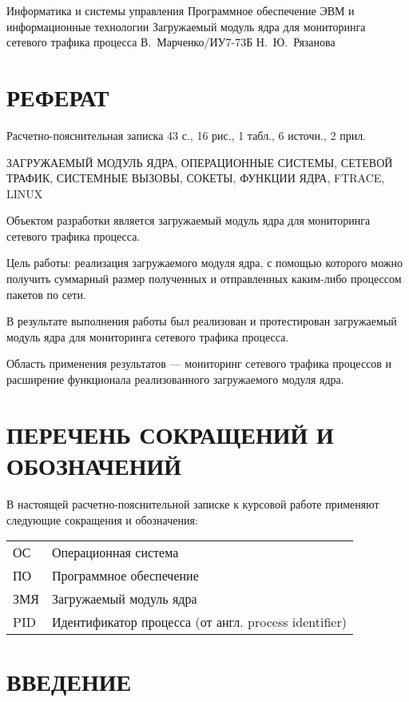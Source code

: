 \documentclass{bmstu}
\begin{document}
\makecourseworktitle
    {Информатика и системы управления}
    {Программное обеспечение ЭВМ и информационные технологии}
    {Загружаемый модуль ядра для мониторинга сетевого трафика процесса}
    {В.~Марченко/ИУ7-73Б}
    {Н.~Ю.~Рязанова}
    {}

\setcounter{page}{3}

{\centering \chapter*{РЕФЕРАТ}}

Расчетно-пояснительная записка 43 с., 16 рис., 1 табл., 6 источн., 2 прил.

\noindent ЗАГРУЖАЕМЫЙ МОДУЛЬ ЯДРА, ОПЕРАЦИОННЫЕ СИСТЕМЫ, СЕТЕВОЙ ТРАФИК, СИСТЕМНЫЕ ВЫЗОВЫ, СОКЕТЫ, ФУНКЦИИ ЯДРА, FTRACE, LINUX

Объектом разработки является загружаемый модуль ядра для мониторинга сетевого трафика процесса.

Цель работы: реализация загружаемого модуля ядра, с помощью которого можно получить суммарный размер полученных и отправленных каким-либо процессом пакетов по сети.

В результате выполнения работы был реализован и протестирован загружаемый модуль ядра для мониторинга сетевого трафика процесса.

Область применения результатов --- мониторинг сетевого трафика процессов и расширение функционала реализованного загружаемого модуля ядра.

{\centering \maketableofcontents}

{\centering \chapter*{ПЕРЕЧЕНЬ СОКРАЩЕНИЙ И ОБОЗНАЧЕНИЙ}}

В настоящей расчетно-пояснительной записке к курсовой работе применяют следующие сокращения и обозначения:

\begin{table}[H]
\begin{tabular}{p{5cm}p{10.5cm}}
ОС & Операционная система
\tabularnewline
ПО & Программное обеспечение
\tabularnewline
ЗМЯ & Загружаемый модуль ядра
\tabularnewline
PID & Идентификатор процесса (от англ. process identifier)
\tabularnewline
\end{tabular}
\end{table}

{\centering \chapter*{ВВЕДЕНИЕ}}
\end{document}
